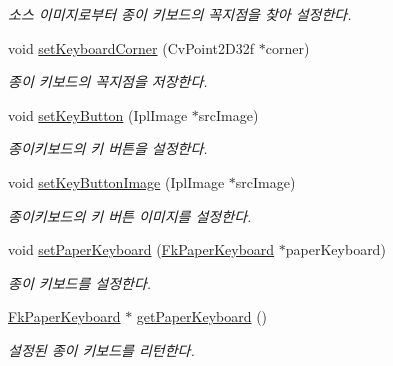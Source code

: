 \begin{DoxyCompactItemize}
\begin{DoxyCompactList}\small\item\em 소스 이미지로부터 종이 키보드의 꼭지점을 찾아 설정한다. \end{DoxyCompactList}\item 
\hypertarget{class_fk_paper_keyboard_recognizer_a731145f3a00dcfaa03826649486224e1}{}void \hyperlink{class_fk_paper_keyboard_recognizer_a731145f3a00dcfaa03826649486224e1}{set\+Keyboard\+Corner} (Cv\+Point2\+D32f $\ast$corner)\label{class_fk_paper_keyboard_recognizer_a731145f3a00dcfaa03826649486224e1}

\begin{DoxyCompactList}\small\item\em 종이 키보드의 꼭지점을 저장한다. \end{DoxyCompactList}\item 
\hypertarget{class_fk_paper_keyboard_recognizer_ada73ab53dbae4ae2209f5cd5168e572d}{}void \hyperlink{class_fk_paper_keyboard_recognizer_ada73ab53dbae4ae2209f5cd5168e572d}{set\+Key\+Button} (Ipl\+Image $\ast$src\+Image)\label{class_fk_paper_keyboard_recognizer_ada73ab53dbae4ae2209f5cd5168e572d}

\begin{DoxyCompactList}\small\item\em 종이키보드의 키 버튼을 설정한다. \end{DoxyCompactList}\item 
\hypertarget{class_fk_paper_keyboard_recognizer_aec093ec714f735f08cd4640b97b73414}{}void \hyperlink{class_fk_paper_keyboard_recognizer_aec093ec714f735f08cd4640b97b73414}{set\+Key\+Button\+Image} (Ipl\+Image $\ast$src\+Image)\label{class_fk_paper_keyboard_recognizer_aec093ec714f735f08cd4640b97b73414}

\begin{DoxyCompactList}\small\item\em 종이키보드의 키 버튼 이미지를 설정한다. \end{DoxyCompactList}\item 
\hypertarget{class_fk_paper_keyboard_recognizer_a16d3b102aef7f3b621281c5c641bc948}{}void \hyperlink{class_fk_paper_keyboard_recognizer_a16d3b102aef7f3b621281c5c641bc948}{set\+Paper\+Keyboard} (\hyperlink{class_fk_paper_keyboard}{Fk\+Paper\+Keyboard} $\ast$paper\+Keyboard)\label{class_fk_paper_keyboard_recognizer_a16d3b102aef7f3b621281c5c641bc948}

\begin{DoxyCompactList}\small\item\em 종이 키보드를 설정한다. \end{DoxyCompactList}\item 
\hypertarget{class_fk_paper_keyboard_recognizer_ab6a8c42603d8a2cb41dea5c4d10316af}{}\hyperlink{class_fk_paper_keyboard}{Fk\+Paper\+Keyboard} $\ast$ \hyperlink{class_fk_paper_keyboard_recognizer_ab6a8c42603d8a2cb41dea5c4d10316af}{get\+Paper\+Keyboard} ()\label{class_fk_paper_keyboard_recognizer_ab6a8c42603d8a2cb41dea5c4d10316af}

\begin{DoxyCompactList}\small\item\em 설정된 종이 키보드를 리턴한다. \end{DoxyCompactList}\end{DoxyCompactItemize}
